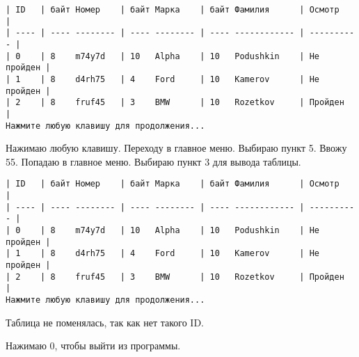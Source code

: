 \begin{tcolorbox}
\begin{verbatim}
| ID   | байт Номер    | байт Марка    | байт Фамилия      | Осмотр     |
| ---- | ---- -------- | ---- -------- | ---- ------------ | ---------- |
| 0    | 8    m74y7d   | 10   Alpha    | 10   Podushkin    | Не пройден |
| 1    | 8    d4rh75   | 4    Ford     | 10   Kamerov      | Не пройден |
| 2    | 8    fruf45   | 3    BMW      | 10   Rozetkov     | Пройден    |
Нажмите любую клавишу для продолжения...
\end{verbatim}
\end{tcolorbox}

Нажимаю любую клавишу. Переходу в главное меню. Выбираю пункт 5. Ввожу 55. Попадаю в главное меню. Выбираю пункт 3 для вывода таблицы.

\begin{tcolorbox}
\begin{verbatim}
| ID   | байт Номер    | байт Марка    | байт Фамилия      | Осмотр     |
| ---- | ---- -------- | ---- -------- | ---- ------------ | ---------- |
| 0    | 8    m74y7d   | 10   Alpha    | 10   Podushkin    | Не пройден |
| 1    | 8    d4rh75   | 4    Ford     | 10   Kamerov      | Не пройден |
| 2    | 8    fruf45   | 3    BMW      | 10   Rozetkov     | Пройден    |
Нажмите любую клавишу для продолжения...
\end{verbatim}
\end{tcolorbox}

Таблица не поменялась, так как нет такого ID.

Нажимаю 0, чтобы выйти из программы.